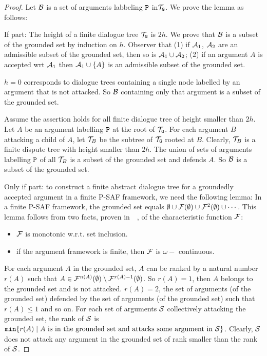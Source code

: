 \begin{proof} Let $\mathcal{B}$ is a set of arguments labbeling $\texttt{\textup{P}}$ in$\mathcal{T}_{\texttt{\textup{G}}}$. We prove the lemma as follows:

If part: The height of a finite dialogue tree $\mathcal{T}_{\texttt{\textup{G}}}$ is $2h$. We prove that $\mathcal{B}$ is a subset of the grounded set by induction on $h$. Observer that (1) if $\mathcal{A}_1$, $\mathcal{A}_2$ are an admissible subset of the grounded set, then so is $\mathcal{A}_1 \cup \mathcal{A}_2$; (2) if an argument $A$ is accepted wrt $\mathcal{A}_1$ then $\mathcal{A}_1 \cup \{A\}$ is an admissible subset of the grounded set. 

$h = 0$ corresponds to dialogue trees containing a single node labelled by an argument that is not attacked. So $\mathcal{B}$ containing only that argument is a subset of the grounded set. 

Assume the assertion holds for all finite dialogue tree of height smaller than $2h$. Let $A$ be an argument labelling $\texttt{\textup{P}}$ at the root of $\mathcal{T}_{\texttt{\textup{G}}}$. For each argument $B$ attacking a child of $A$, let $\mathcal{T}_{B}$ be the subtree of $\mathcal{T}_{\texttt{\textup{G}}}$ rooted at $B$. Clearly, $\mathcal{T}_{B}$ is a finite dispute tree with height smaller than $2h$. The union of sets of arguments labelling $\texttt{\textup{P}}$ of all $\mathcal{T}_{B}$ is a subset of the grounded set and defends $A$. So $\mathcal{B}$ is a subset of the grounded set.

Only if part: to construct a finite abstract dialogue tree for a groundedly accepted argument in a finite P-SAF framework, we need the following lemma: In a finite P-SAF framework, the grounded set equals $\emptyset \cup \mathcal{F}(\emptyset) \cup \mathcal{F}^{2}(\emptyset) \cup \cdots$. This lemma follows from two facts, proven in~~\cite{Dung95}, of the characteristic function $\mathcal{F}$:
\begin{itemize}
    \item $\mathcal{F}$ is monotonic w.r.t. set inclusion.
    \item if the argument framework is finite, then $\mathcal{F}$ is $\omega-$ continuous.
\end{itemize}
For each argument $A$ in the grounded set, $A$ can be ranked by a natural number $r(A)$ such that $A \in \mathcal{F}^{n(A)} (\emptyset) \setminus \mathcal{F}^{r(A) -1} (\emptyset)$. So $r(A) = 1$, then $A$ belongs to the grounded set and is not attacked. $r(A) = 2$, the set of arguments (of the grounded set) defended by the set of arguments (of the grounded set) such that $r(A) \leq 1$ and so on. For each set of arguments $\mathcal{S}$ collectively attacking the grounded set,  the rank of $\mathcal{S}$ is $\texttt{min} \{r(A) \mid A \text{ is in the grounded set and attacks some argument in } \mathcal{S} \}$. Clearly, $\mathcal{S}$ does not attack any argument in the grounded set of rank smaller than the rank of $\mathcal{S}$.


\end{proof}
